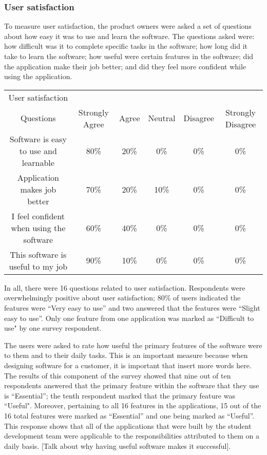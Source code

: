 \subsubsection{User satisfaction}
To measure user satisfaction, the product owners were asked a set of questions about how easy it was to use and learn the software. The questions asked were: how difficult was it to complete specific tasks in the software; how long did it take to learn the software; how useful were certain features in the software; did the application make their job better; and did they feel more confident while using the application. 

\begin{tabular}{cccccc}
User satisfaction & & & & & \\
Questions & Strongly Agree & Agree & Neutral & Disagree & Strongly Disagree \\
Software is easy to use and learnable & 80\% & 20\% & 0\% & 0\% & 0\% \\
Application makes job better & 70\% & 20\% & 10\% & 0\% & 0\% \\
I feel confident when using the software & 60\% & 40\% & 0\% & 0\% & 0\% \\
This software is useful to my job & 90\% & 10\% & 0\% & 0\% & 0\% \\
\end{tabular}

In all, there were 16 questions related to user satisfaction. Respondents were overwhelmingly positive about user satisfaction; 80\% of users indicated the features were ``Very easy to use'' and two answered that the features were ``Slight easy to use''. Only one feature from one application was marked as ``Difficult to use" by one survey respondent.

The users were asked to rate how useful the primary features of the software were to them and to their daily tasks. This is an important measure because when designing software for a customer, it is important that {insert more words here}. The results of this component of the survey showed that nine out of ten respondents answered that the primary feature within the software that they use is ``Essential''; the tenth respondent marked that the primary feature was ``Useful". Moreover, pertaining to all 16 features in the applications, 15 out of the 16 total features were marked as ``Essential'' and one being marked as ``Useful''. This response shows that all of the applications that were built by the student development team were applicable to the responsibilities attributed to them on a daily basis. [Talk about why having useful software makes it successful].

